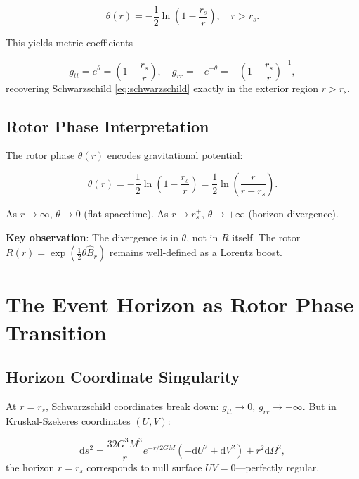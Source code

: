 \documentclass[11pt,a4paper]{article}
\numberwithin{equation}{section}
\theoremstyle{plain}
\theoremstyle{definition}
\theoremstyle{remark}
\renewcommand{\dd}{\mathrm{d}}
\begin{document}
\begin{equation}
\theta(r) = -\frac{1}{2}\ln\left(1 - \frac{r_s}{r}\right), \quad r > r_s.
\label{eq:theta-exterior}
\end{equation}

This yields metric coefficients

\begin{equation}
g_{tt} = e^{\theta} = \left(1 - \frac{r_s}{r}\right), \quad g_{rr} = -e^{-\theta} = -\left(1 - \frac{r_s}{r}\right)^{-1},
\end{equation}
recovering Schwarzschild \eqref{eq:schwarzschild} exactly in the exterior region $r > r_s$.

\subsection{Rotor Phase Interpretation}

The rotor phase $\theta(r)$ encodes gravitational potential:

\begin{equation}
\theta(r) = -\frac{1}{2}\ln\left(1 - \frac{r_s}{r}\right) = \frac{1}{2}\ln\left(\frac{r}{r - r_s}\right).
\end{equation}

As $r \to \infty$, $\theta \to 0$ (flat spacetime).
As $r \to r_s^+$, $\theta \to +\infty$ (horizon divergence).

\textbf{Key observation}: The divergence is in $\theta$, not in $R$ itself. The rotor $R(r) = \exp(\frac{1}{2}\theta \hat{B}_r)$ remains well-defined as a Lorentz boost.

\section{The Event Horizon as Rotor Phase Transition}
\label{sec:horizon}

\subsection{Horizon Coordinate Singularity}

At $r = r_s$, Schwarzschild coordinates break down: $g_{tt} \to 0$, $g_{rr} \to -\infty$. But in Kruskal-Szekeres coordinates $(U, V)$:

\begin{equation}
\dd s^2 = \frac{32G^3M^3}{r} e^{-r/2GM} (-\dd U^2 + \dd V^2) + r^2 \dd\Omega^2,
\end{equation}
the horizon $r = r_s$ corresponds to null surface $UV = 0$—perfectly regular.
\end{document}
